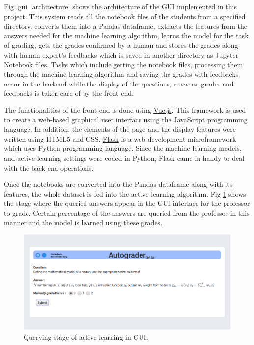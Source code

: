 	Fig \ref{gui_architecture} shows the architecture of the GUI implemented in this project. This system reads all the notebook files of the students from a specified directory, converts them into a Pandas dataframe, extracts the features from the answers needed for the machine learning algorithm, learns the model for the task of grading, gets the grades confirmed by a human and stores the grades along with human expert's feedbacks which is saved in another directory as Jupyter Notebook files. Tasks which include getting the notebook files, processing them through the machine learning algorithm and saving the grades with feedbacks occur in the backend while the display of the questions, answers, grades and feedbacks is taken care of by the front end. 
	
	The functionalities of the front end is done using \href{https://vuejs.org/}{Vue.js}. This framework is used to create a web-based graphical user interface using the JavaScript programming language. In addition, the elements of the page and the display features were written using HTML5 and CSS. \href{http://flask.pocoo.org/}{Flask} is a web development microframework which uses Python programming language. Since the machine learning models, and active learning settings were coded in Python, Flask came in handy to deal with the back end operations. 
	
	Once the notebooks are converted into the Pandas dataframe along with its features, the whole dataset is fed into the active learning algorithm. Fig \ref{gui_1} shows the stage where the queried answers appear in the GUI interface for the professor to grade. Certain percentage of the answers are queried from the professor in this manner and the model is learned using these grades. 
	
	\begin{figure}[!htb]
		\centering
		\includegraphics[scale=0.38]{images/gui_1}
		\caption{Querying stage of active learning in GUI.}
		\label{gui_1}
	\end{figure}  
	
